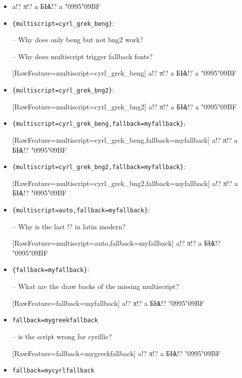 \documentclass{article}
\begin{document}
\begin{itemize}
\item a!? π!? a БѨ!? a \char"0995\char"09BF

\item \verb+{multiscript=cyrl_grek_beng}+:

-- Why does only beng but not bng2 work?

-- Why does multiscript trigger fallback fonts? 

[RawFeature={multiscript=cyrl_grek_beng}]
a!? π!? a БѨ!? a \char"0995\char"09BF

\item \verb+{multiscript=cyrl_grek_bng2}+:

[RawFeature={multiscript=cyrl_grek_bng2}]
a!? π!? a БѨ!? a \char"0995\char"09BF

\item \verb+{multiscript=cyrl_grek_beng,fallback=myfallback}+:

[RawFeature={multiscript=cyrl_grek_beng,fallback=myfallback}]
a!? π!? a БѨ!? \char"0995\char"09BF

\item \verb+{multiscript=cyrl_grek_bng2,fallback=myfallback}+:

[RawFeature={multiscript=cyrl_grek_bng2,fallback=myfallback}]
a!? π!? a БѨ!? \char"0995\char"09BF

\item \verb+{multiscript=auto,fallback=myfallback}+:

-- Why is the last !? in latin modern?

[RawFeature={multiscript=auto,fallback=myfallback}]
a!? π!? a БѨ!? \char"0995\char"09BF

\item \verb+{fallback=myfallback}+:

-- What are the draw backs of the missing multiscript? 

[RawFeature={fallback=myfallback}]
a!? π!? a БѨ!? \char"0995\char"09BF

\item \verb+fallback=mygreekfallback+

-- is the script wrong for cyrillic?

[RawFeature={fallback=mygreekfallback}]
a!? π!? a БѨ!? \char"0995\char"09BF

\item \verb+fallback=mycyrlfallback+


\end{itemize}
\end{document}
